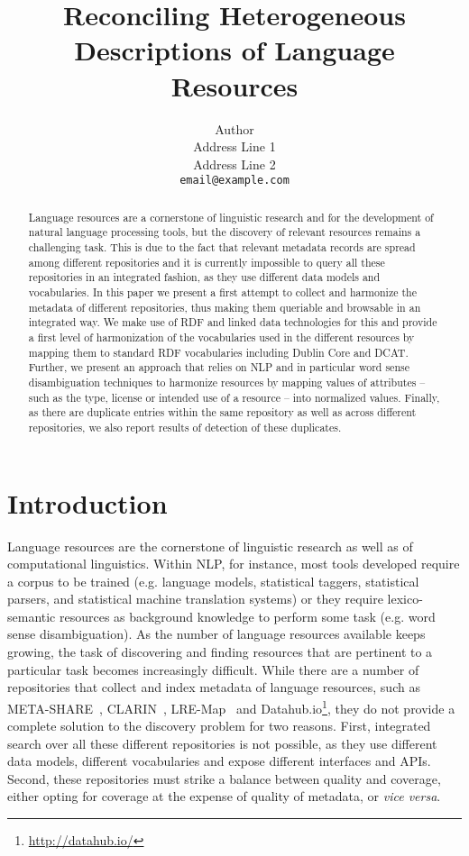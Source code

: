 \documentclass[11pt]{article}
\title{Reconciling Heterogeneous Descriptions of Language Resources}
\author{Author \\
    Address Line 1\\
    Address Line 2\\
{\scriptsize\tt email@example.com}}
\date{}
\begin{document}
\maketitle
\begin{abstract}
        Language resources are a cornerstone of linguistic research and for the
        development of natural language processing tools, 
	but the discovery of relevant resources remains a challenging task.
        This is due to the fact that relevant metadata records are spread among
        different repositories and it is currently impossible to query all these
        repositories in an integrated fashion, as they use different data
        models and vocabularies. In this paper we present a first attempt to
        collect and harmonize the metadata of different repositories, thus
        making them queriable and browsable in an integrated way. We make use
        of RDF and linked data technologies for this and provide a first level
        of harmonization of the vocabularies used in the different resources by
        mapping them to standard RDF vocabularies including Dublin Core and
        DCAT. Further, we present an approach that relies on NLP and in
        particular word sense disambiguation techniques to harmonize resources
        by mapping values of attributes -- such as the type, license or intended
        use of a resource -- into normalized values. Finally, as there are
        duplicate entries within the same repository as well as across different
        repositories, we also report results of detection of these duplicates.
\end{abstract}

\section{Introduction}

Language resources are the cornerstone of linguistic research as well as of
computational linguistics. Within NLP, for instance, most tools developed
require a corpus to be trained (e.g. language models, statistical taggers,
statistical parsers, and statistical machine translation systems) or they
require lexico-semantic resources as background knowledge to perform some task
(e.g. word sense disambiguation). 
As the number of language resources available keeps growing, the task of
discovering and finding resources that are pertinent to a particular task
becomes increasingly difficult. While there are a number of repositories that
collect and index metadata of language resources, such as
META-SHARE~\cite{federmann2012meta},
CLARIN~\cite{broeder2010data}, LRE-Map~\cite{calzolari2012lre} and
Datahub.io\footnote{\url{http://datahub.io/}}, they do not provide a complete
solution to the discovery problem for two reasons. First, integrated search over
all these different repositories is not possible, as they use different data
models, different vocabularies and expose different interfaces and APIs. 
Second, these repositories must strike a balance between quality and coverage,
either opting for coverage at the expense of quality of metadata, or \emph{vice
versa}.
\end{document}
